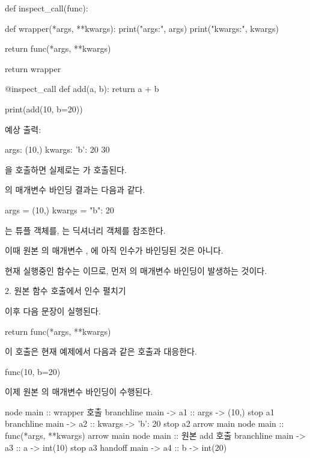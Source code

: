 \begin{dhkcode}
def inspect_call(func):

    def wrapper(*args, **kwargs):
        print("args:", args)
        print("kwargs:", kwargs)

        return func(*args, **kwargs)

    return wrapper


@inspect_call
def add(a, b):
    return a + b


print(add(10, b=20))
\end{dhkcode}

예상 출력:

\begin{dhkzsh}
args: (10,)
kwargs: {'b': 20}
30
\end{dhkzsh}

을 호출하면 실제로는 가 호출된다.

의 매개변수 바인딩 결과는 다음과 같다.

\begin{dhkzsh}
args = (10,)
kwargs = {"b": 20}
\end{dhkzsh}

는 튜플 객체를, 는 딕셔너리 객체를 참조한다.

이때 원본 의 매개변수 , 에 아직 인수가 바인딩된 것은 아니다.

현재 실행중인 함수는 이므로, 먼저 의 매개변수 바인딩이 발생하는 것이다.

\begin{dhknote}
\begin{dhksmry}[centered]
2. 원본 함수 호출에서 인수 펼치기
\end{dhksmry}
\end{dhknote}

이후 다음 문장이 실행된다.

\begin{dhkcode}
return func(*args, **kwargs)
\end{dhkcode}

이 호출은 현재 예제에서 다음과 같은 호출과 대응한다.

\begin{dhkcode}
func(10, b=20)
\end{dhkcode}

이제 원본 의 매개변수 바인딩이 수행된다.

\begin{dhkbranch}[in=8]
node main :: wrapper 호출
branchline main -> a1 :: args -> (10,)
stop a1
branchline main -> a2 :: kwargs -> {'b': 20}
stop a2
arrow main
node main :: func(*args, **kwargs)
arrow main
node main :: 원본 add 호출
branchline main -> a3 :: a -> int(10)
stop a3
handoff main -> a4 :: b -> int(20)
\end{dhkbranch}

